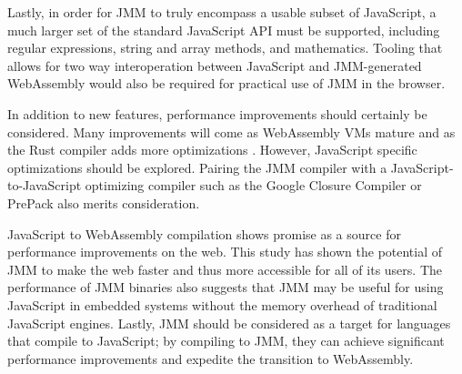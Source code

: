 \documentclass[12pt]{article}
\begin{document}
	Lastly, in order for JMM to truly encompass a usable subset of JavaScript, a much larger set of the standard JavaScript API must be supported, including regular expressions, string and array methods, and mathematics. Tooling that allows for two way interoperation between JavaScript and JMM-generated WebAssembly would also be required for practical use of JMM in the browser.
	
	In addition to new features, performance improvements should certainly be considered. Many improvements will come as WebAssembly VMs mature \cite{Clark2017} and as the Rust compiler adds more optimizations \cite{Matsakis2016}. However, JavaScript specific optimizations should be explored. Pairing the JMM compiler with a JavaScript-to-JavaScript optimizing compiler such as the Google Closure Compiler \cite{ClosureCompiler} or PrePack \cite{prepack} also merits consideration.
	
	JavaScript to WebAssembly compilation shows promise as a source for performance improvements on the web. This study has shown the potential of JMM to make the web faster and thus more accessible for all of its users. The performance of JMM binaries also suggests that JMM may be useful for using JavaScript in embedded systems without the memory overhead of traditional JavaScript engines. Lastly, JMM should be considered as a target for languages that compile to JavaScript; by compiling to JMM, they can achieve significant performance improvements and expedite the transition to WebAssembly.
	
	\newpage
	
	
	
\end{document}
